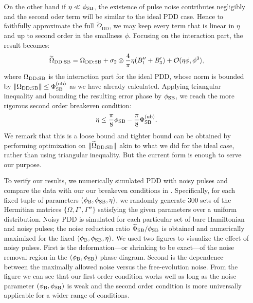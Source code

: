 \documentclass[b5paper,11pt]{article}
\newcommand{\wt}[1]{\widetilde{#1}}
\newcommand{\rDD}{\mathrm{DD}}
\begin{document}
On the other hand if $\eta\ll \phi_{\mathrm{SB}}$, the existence of pulse noise contributes negligibly and the second oder term will be similar to the ideal PDD case. Hence to faithfully approximate the full $\wt\Omega_\rDD$, we may keep every term that is linear in $\eta$ and up to second order in the smallness $\phi$. Focusing on the interaction part, the result becomes:
\begin{equation}
 \wt\Omega_{\rDD:\rSB} = \Omega_{\rDD:\rSB} +\sigma_2 \otimes \frac{4}{\pi}\eta(B_1''+B_3') + \cO(\eta\phi,\phi^3),
\end{equation}
where $\Omega_{\rDD:\rSB}$ is the interaction part for the ideal PDD, whose norm is bounded by $\norm{\Omega_{\rDD:\rSB}} \le \Phi_\rSB^{(\mathrm{ub})}$ 
as we have already calculated.
Applying triangular inequality and bounding the resulting error phase by $\phi_{\mathrm{SB}}$, we reach the more rigorous second order breakeven condition:
\begin{equation}\label{eq:npulses-breakeven2}
   \eta \le \frac{\pi}{8} \phi_{\mathrm{SB}} - \frac{\pi}{8}\Phi_{\mathrm{SB}}^{(\mathrm{ub})}.
\end{equation}
We remark that this is a loose bound and tighter bound can be obtained by performing optimization on $\norm{\wt\Omega_{\rDD:\rSB}}$ akin to what we did for the ideal case, rather than using triangular inequality. But the current form is enough to serve our purpose.

To verify our results, we numerically simulated PDD with noisy pulses and compare the data with our our breakeven conditions in . 
Specifically, for each fixed tuple of parameters $(\phi_{\mathrm{B}},\phi_{\mathrm{SB}},\eta)$, we randomly generate 300 sets of the Hermitian matrices $\{\Omega,\Gamma',\Gamma''\}$
satisfying the given parameters over a uniform distribution. Noisy PDD is simulated for each particular set of  bare Hamiltonian and noisy pulses; the noise reduction ratio $\wt\Phi_\rSB/\phi_\rSB$ is obtained and numerically maximized for the fixed $(\phi_{\mathrm{B}},\phi_{\mathrm{SB}},\eta)$. 
We used two figures to visualize the effect of noisy pulses. First is the deformation---or shrinking to be exact---of the noise removal region in the $(\phi_{\mathrm{B}},\phi_{\mathrm{SB}})$ phase diagram. Second is the dependence between the maximally allowed noise versus the free-evolution noise. From the figure we can see that our first order condition works well as long as the noise parameter $(\phi_{\mathrm{B}},\phi_{\mathrm{SB}})$ is weak and the second order condition is more universally applicable for a wider range of conditions.
\end{document}
